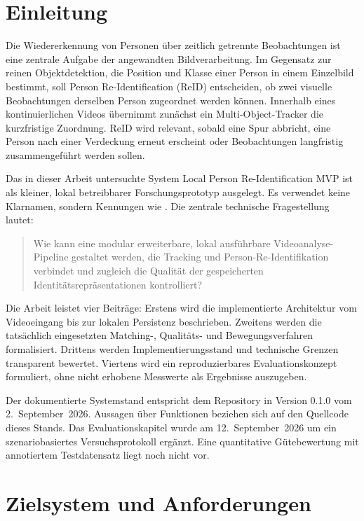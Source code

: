 \documentclass[runningheads]{llncs}
\newcommand{\systemname}{Local Person Re-Identification MVP}
\begin{document}
\section{Einleitung}

Die Wiedererkennung von Personen über zeitlich getrennte Beobachtungen ist eine zentrale Aufgabe der angewandten Bildverarbeitung. Im Gegensatz zur reinen Objektdetektion, die Position und Klasse einer Person in einem Einzelbild bestimmt, soll Person Re-Identification (ReID) entscheiden, ob zwei visuelle Beobachtungen derselben Person zugeordnet werden können. Innerhalb eines kontinuierlichen Videos übernimmt zunächst ein Multi-Object-Tracker die kurzfristige Zuordnung. ReID wird relevant, sobald eine Spur abbricht, eine Person nach einer Verdeckung erneut erscheint oder Beobachtungen langfristig zusammengeführt werden sollen.

Das in dieser Arbeit untersuchte System \systemname{} ist als kleiner, lokal betreibbarer Forschungsprototyp ausgelegt. Es verwendet keine Klarnamen, sondern Kennungen wie . Die zentrale technische Fragestellung lautet:

\begin{quote}
Wie kann eine modular erweiterbare, lokal ausführbare Videoanalyse-Pipeline gestaltet werden, die Tracking und Person-Re-Identifikation verbindet und zugleich die Qualität der gespeicherten Identitätsrepräsentationen kontrolliert?
\end{quote}

Die Arbeit leistet vier Beiträge: Erstens wird die implementierte Architektur vom Videoeingang bis zur lokalen Persistenz beschrieben. Zweitens werden die tatsächlich eingesetzten Matching-, Qualitäts- und Bewegungsverfahren formalisiert. Drittens werden Implementierungsstand und technische Grenzen transparent bewertet. Viertens wird ein reproduzierbares Evaluationskonzept formuliert, ohne nicht erhobene Messwerte als Ergebnisse auszugeben.

Der dokumentierte Systemstand entspricht dem Repository in Version 0.1.0 vom 2.~September~2026. Aussagen über Funktionen beziehen sich auf den Quellcode dieses Stands. Das Evaluationskapitel wurde am 12.~September~2026 um ein szenariobasiertes Versuchsprotokoll ergänzt. Eine quantitative Gütebewertung mit annotiertem Testdatensatz liegt noch nicht vor.

\section{Zielsystem und Anforderungen}
\end{document}
